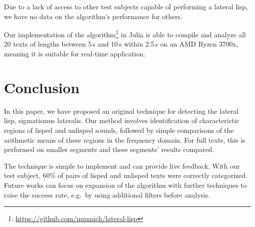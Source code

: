 \documentclass{IEEEtran}
\begin{document}
Due to a lack of access to other test subjects capable of performing a lateral lisp,
we have no data on the algorithm's performance for others.

Our implementation of the algorithm\footnote{\url{https://github.com/munnich/lateral-lisp}} in Julia is able to compile and analyze all 20 texts of lengths between 5\,s and 10\,s within 2.5\,s on an AMD Ryzen 3700x,
meaning it is suitable for real-time application.

\section{Conclusion}

In this paper,
we have proposed an original technique for detecting the lateral lisp,
sigmatismus lateralis.
Our method involves identification of characteristic regions of lisped and unlisped sounds,
followed by simple comparisons of the arithmetic means of these regions in the frequency domain.
For full texts,
this is performed on smaller segments and these segments' results compared.

The technique is simple to implement and can provide live feedback.
With our test subject,
60\% of pairs of lisped and unlisped texts were correctly categorized.
Future works can focus on expansion of the algorithm with further techniques to raise the success rate,
e.g.\ by using additional filters before analysis.

\nocite{*}

\printbibliography
\end{document}
